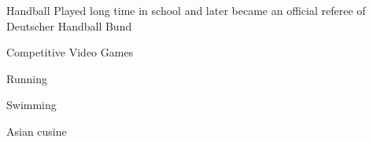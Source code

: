 



\begin{cvhonors}

  \cvhonor
    {Handball} %
    {Played long time in school and later became an official referee of Deutscher Handball Bund} %
    {} %
    {} %

  \cvhonor
    {Competitive Video Games} %
    {} %
    {} %
    {} %

  \cvhonor
  {Running} %
  {} %
  {} %
  {} %

\end{cvhonors}




\begin{cvhonors}

  \cvhonor
    {Swimming} %
    {} %
    {} %
    {} %

  \cvhonor
  {Asian cusine} %
  {} %
  {} %
  {} %

\end{cvhonors}
